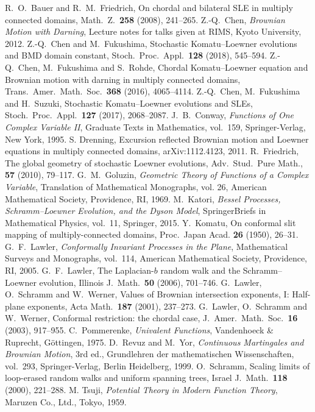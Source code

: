 \documentclass[preprint,12pt]{elsarticle}
\theoremstyle{definition}
\begin{document}
\begin{thebibliography}{00}


 R.\ O.\ Bauer and R.\ M.\ Friedrich, On chordal and bilateral SLE in multiply connected domains, Math.\ Z.\ {\bf 258} (2008), 241--265.
 Z.-Q.\ Chen, {\it Brownian Motion with Darning}, Lecture notes for talks given at RIMS, Kyoto University, 2012.
 Z.-Q.\ Chen and M.\ Fukushima, Stochastic Komatu--Loewner evolutions and BMD domain constant, Stoch.\ Proc.\ Appl.\ {\bf 128} (2018), 545--594.
 Z.-Q.\ Chen, M.\ Fukushima and S.\ Rohde, Chordal Komatu--Loewner equation and Brownian motion with darning in multiply connected domains, Trans.\ Amer.\ Math.\ Soc.\ {\bf 368} (2016), 4065--4114.
 Z.-Q.\ Chen, M.\ Fukushima and H.\ Suzuki, Stochastic Komatu--Loewner evolutions and SLEs, Stoch.\ Proc.\ Appl.\ {\bf 127} (2017), 2068--2087.
 J.\ B.\ Conway, {\it Functions of One Complex Variable II}, Graduate Texts in Mathematics, vol.\ 159, Springer-Verlag, New York, 1995.
 S. Drenning, Excursion reflected Brownian motion and Loewner equations in multiply connected domains, arXiv:1112.4123, 2011.
 R.\ Friedrich, The global geometry of stochastic Loewner evolutions, Adv.\ Stud.\ Pure Math., {\bf 57} (2010), 79--117.
 G.\ M.\ Goluzin, {\it Geometric Theory of Functions of a Complex Variable}, Translation of Mathematical Monographs, vol. 26, American Mathematical Society, Providence, RI, 1969.
 M.\ Katori, {\it Bessel Processes, Schramm--Loewner Evolution, and the Dyson Model}, SpringerBriefs in Mathematical Physics, vol.\ 11, Springer, 2015.
 Y.\ Komatu, On conformal slit mapping of multiply-connected domains, Proc.\ Japan Acad. {\bf 26} (1950), 26--31.
 G.\ F.\ Lawler, {\it Conformally Invariant Processes in the Plane}, Mathematical Surveys and Monographs, vol.\ 114, American Mathematical Society, Providence, RI, 2005.
 G.\ F.\ Lawler, The Laplacian-$b$ random walk and the Schramm--Loewner evolution, Illinois J.\ Math.\ {\bf 50} (2006), 701--746.
 G.\ Lawler, O.\ Schramm and W.\ Werner, Values of Brownian intersection exponents, I: Half-plane exponents, Acta Math.\ {\bf 187} (2001), 237--273.
 G.\ Lawler, O.\ Schramm and W.\ Werner, Conformal restriction: the chordal case, J.\ Amer.\ Math.\ Soc.\ {\bf 16} (2003), 917--955.
 C.\ Pommerenke, {\it Univalent Functions}, Vandenhoeck {\&} Ruprecht, G\"ottingen, 1975.
 D.\ Revuz and M.\ Yor, {\it Continuous Martingales and Brownian Motion}, 3rd ed., Grundlehren der mathematischen Wissenschaften, vol.\ 293, Springer-Verlag, Berlin Heidelberg, 1999.
 O.\ Schramm, Scaling limits of loop-erased random walks and uniform spanning trees, Israel J.\ Math.\ {\bf 118} (2000), 221--288.
 M. Tsuji, {\it Potential Theory in Modern Function Theory}, Maruzen Co., Ltd., Tokyo, 1959.

\end{thebibliography}
\end{document}
